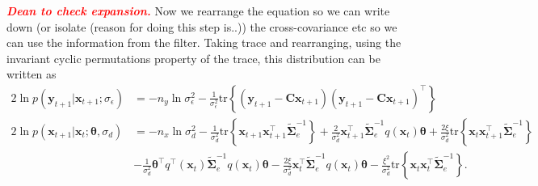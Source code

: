 \documentclass[]{article}
\newcommand{\dean}[1]{\textsf{\emph{\textbf{\textcolor{red}{#1}}}}}
\begin{document}
\dean{Dean to check expansion.} Now we rearrange the equation so we can write down (or isolate (reason for doing this step is..)) the cross-covariance etc so we can use the information from the filter. Taking trace and rearranging, using the invariant cyclic permutations property of the trace, this distribution can be written as
\begin{align}\label{eq:Qfunctiontrace1}
  2\ln p\left(\mathbf y_{t+1}|\mathbf x_{t+1};\sigma_{\epsilon}\right) &= -n_y\ln \sigma_{\epsilon}^2-\frac{1}{\sigma_{\epsilon}^2}\mathrm{tr}\left\lbrace(\mathbf y_{t+1}-\mathbf C\mathbf  x_{t+1}) (\mathbf y_{t+1}-\mathbf C\mathbf  x_{t+1})^\top\right\rbrace    \\
 2 \ln p(\mathbf x_{t+1}|\mathbf x_{t};\boldsymbol \theta ,\sigma_d) &=-n_x\ln\sigma_d^2-\frac{1}{\sigma_d^2}\mathrm{tr}\left\lbrace\mathbf x_{t+1} \mathbf x_{t+1}^\top\tilde{\boldsymbol\Sigma}_e^{-1}\right\rbrace+\frac{2}{\sigma_d^2}\mathbf x_{t+1}^\top\tilde{\boldsymbol\Sigma}_e^{-1}q( \mathbf x_t)\boldsymbol\theta+\frac{2\xi}{\sigma_d^2} \mathrm{tr} \left\lbrace \mathbf x_t\mathbf x_{t+1}^\top\tilde{\boldsymbol\Sigma}_e^{-1}\right\rbrace \nonumber \\
&-\frac{1}{\sigma_d^2}\boldsymbol\theta^\top q^\top(\mathbf x_t)\tilde{\boldsymbol\Sigma}_e^{-1}q(\mathbf x_t)\boldsymbol\theta-\frac{2\xi}{\sigma_d^2} \mathbf x_t^\top\tilde{\boldsymbol\Sigma}_e^{-1}q(\mathbf x_t)\boldsymbol\theta-\frac{\xi^2}{\sigma_d^2}\mathrm{tr}\left\lbrace \mathbf x_t \mathbf x_t^\top\tilde{\boldsymbol\Sigma}_e^{-1}\right\rbrace. \label{eq:Qfunctiontrace2}
\end{align}
\end{document}
